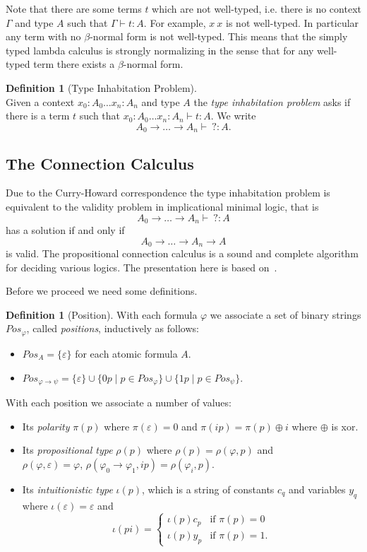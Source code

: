\documentclass[11pt]{article}
\theoremstyle{definition}
\theoremstyle{definition}
\theoremstyle{definition}
\theoremstyle{definition}
\theoremstyle{definition}
\newtheorem{definition}[theorem]{Definition}
\theoremstyle{definition}
\theoremstyle{definition}
\newcommand{\pos}{\mathit{Pos}}
\begin{document}
	Note that there are some terms $t$ which are not well-typed, i.e. there is no context $\Gamma$ and type $A$ such that $\Gamma\vdash t: A$. For example, $x\ x$ is not well-typed. In particular any term with no $\beta$-normal form is not well-typed. This means that the simply typed lambda calculus is strongly normalizing in the sense that for any well-typed term there exists a $\beta$-normal form.

	\begin{definition}[Type Inhabitation Problem]\hfill\\
		Given a context $x_0: A_0\dots x_n:A_n$ and type $A$ the \emph{type inhabitation problem} asks if there is a term $t$ such that $x_0: A_0\dots x_n:A_n\vdash t: A$. We write
		\[A_0\to\dots\to A_n\vdash\ ?: A.\]
	\end{definition}
	
	\subsection{The Connection Calculus}
	Due to the Curry-Howard correspondence the type inhabitation problem is equivalent to the validity problem in implicational minimal logic, that is
	\[A_0\to\dots\to A_n\vdash\ ?:A\]
	has a solution if and only if
	\[A_0\to\dots\to A_n\to A\]
	is valid. The propositional connection calculus is a sound and complete algorithm for deciding various logics. The presentation here is based on~\cite{kreitz1999connection}.

	Before we proceed we need some definitions.
	\begin{definition}[Position]\label{def:position}
		With each formula $\varphi$ we associate a set of binary strings $\pos_\varphi$, called \emph{positions}, inductively as follows:
		\begin{itemize}
			\item $\pos_A = \{\varepsilon\}$ for each atomic formula $A$.
			\item $\pos_{\varphi\to\psi} = \{\varepsilon\}\cup\{0p\mid p\in\pos_\varphi\}\cup\{1p\mid p\in\pos_\psi\}$.
		\end{itemize}
		With each position we associate a number of values:
		\begin{itemize}
			\item Its \emph{polarity} $\pi(p)$ where $\pi(\varepsilon) = 0$ and $\pi(ip) = \pi(p) \oplus i$ where $\oplus$ is xor.
			\item Its \emph{propositional type} $\rho(p)$ where $\rho(p) = \rho(\varphi, p)$ and\\$\rho(\varphi, \varepsilon) = \varphi$, $\rho(\varphi_0\to\varphi_1, ip) = \rho(\varphi_i, p)$.
			\item Its \emph{intuitionistic type} $\iota(p)$, which is a string of constants $c_q$ and variables $y_q$ where $\iota(\varepsilon) = \varepsilon$ and
			\[\iota(pi) = \begin{cases}
				\iota(p)c_p & \text{if } \pi(p) = 0\\
				\iota(p)y_p & \text{if } \pi(p) = 1.
			\end{cases}\]
		\end{itemize}
	\end{definition}
\end{document}

